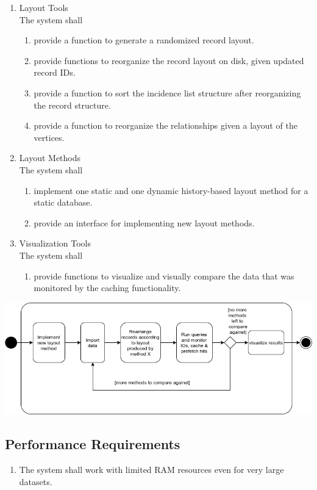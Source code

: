 \begin{enumerate}[label*=\arabic*]
\item Layout Tools \\
    The system shall
\begin{enumerate}[label*=\arabic*]
	\item provide a function to generate a randomized record layout.
	\item provide functions to reorganize the record layout on disk, given updated record IDs.
	\item provide a function to sort the incidence list structure after reorganizing the record structure.
	\item provide a function to reorganize the relationships given a layout of the vertices.
\end{enumerate}

\item Layout Methods \\
    The system shall
\begin{enumerate}[label*=\arabic*]
	\item implement one static and one dynamic history-based layout method for a static database.
	\item provide an interface for implementing new layout methods.
\end{enumerate}

\item Visualization Tools \\
    The system shall
\begin{enumerate}[label*=\arabic*]
    \item provide functions to visualize and visually compare the data that was monitored by the caching functionality.
\end{enumerate}
\end{enumerate}
\begin{center}
 \includegraphics[keepaspectratio, width=\textwidth]{img/activity.png}
\end{center}


\subsection{Performance Requirements}
\begin{enumerate}[label*=\arabic*]
		\item The system shall work with limited RAM resources even for very large datasets.
\end{enumerate}

